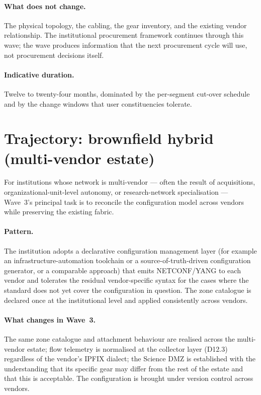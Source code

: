 \paragraph{What does not change.} The physical topology, the
cabling, the gear inventory, and the existing vendor relationship.
The institutional procurement framework continues through this
wave; the wave produces information that the next procurement
cycle will use, not procurement decisions itself.

\paragraph{Indicative duration.} Twelve to twenty-four months,
dominated by the per-segment cut-over schedule and by the change
windows that user constituencies tolerate.

\section{Trajectory: brownfield hybrid (multi-vendor estate)}
\label{sec:w3-brownfield-hybrid}

For institutions whose network is multi-vendor --- often the
result of acquisitions, organizational-unit-level autonomy, or
research-network specialisation --- Wave~3's principal task is to
reconcile the
configuration model across vendors while preserving the existing
fabric.

\paragraph{Pattern.} The institution adopts a declarative
configuration management layer (for example an
infrastructure-automation toolchain or a source-of-truth-driven
configuration generator, or a comparable approach)
that emits NETCONF/YANG to each vendor and tolerates the residual
vendor-specific syntax for the cases where the standard does not
yet cover the configuration in question. The zone catalogue is
declared once at the institutional level and applied consistently
across vendors.

\paragraph{What changes in Wave~3.} The same zone catalogue and
attachment behaviour are realised across the multi-vendor estate;
flow telemetry is normalised at the collector layer (D12.3)
regardless of the vendor's IPFIX dialect; the Science DMZ is
established with the understanding that its specific gear may
differ from the rest of the estate and that this is acceptable.
The configuration is brought under version control across vendors.

